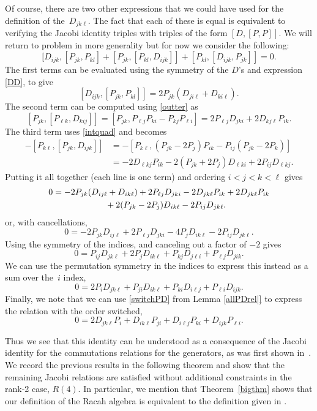 \documentclass[pdftex]{sigma}
\numberwithin{equation}{section}
\begin{document}
Of course, there are two other expressions that we could have used for the definition of the~$D_{jk\ell}$. The fact that each of these is equal is equivalent to verifying the Jacobi identity triples with triples of the form $[D, [P, P]]$. We will return to problem in more generality but for now we consider the following:
\[
[ D_{ijk}, [P_{jk}, P_{kl}]+ [ P_{jk}, [ P_{kl}, D_{ijk}]]+[P_{kl}, [ D_{ijk}, P_{jk}]]=0 .
\]
The first terms can be evaluated using the symmetry of the $D$'s and expression \eqref{DD}, to give
\[
[ D_{ijk}, [P_{jk}, P_{kl}]]= 2P_{jk}( D_{ji\ell}+D_{ki\ell}).
\]
The second term can be computed using \eqref{outter} as
\[ [ P_{jk}, [ P_{\ell k}, D_{kij}]] = [P_{jk}, P_{\ell j}P_{ki} - P_{kj}P_{\ell i}] = 2P_{\ell j} D_{jki}+2D_{kj\ell} P_{ik}.\]
The third term uses \eqref{intquad} and becomes
\begin{align*}
-[P_{k\ell}, [ P_{jk}, D_{ijk}]] &= -[P_{k\ell},( P_{jk}-2P_j)P_{ik} - P_{ij}(P_{jk}-2P_{k})]\\
&= -2D_{\ell kj}P_{ik} -2(P_{jk} +2P_j)D_{\ell k i}+2P_{ij}D_{\ell k j}.
\end{align*}
Putting it all together (each line is one term) and ordering $i< j< k <\ell$ gives
\begin{gather*}
0 =  -2P_{jk}(D_{ ij \ell} +D_{ i k\ell})+2P_{\ell j} D_{jki}-2D_{jk\ell} P_{ik}
+2D_{jk\ell}P_{ik}\\
\hphantom{0=} +2(P_{jk} -2P_j)D_{ik \ell}-2P_{ij}D_{jk\ell} .
\end{gather*}
 or, with cancellations,
\[ 0 =-2P_{jk}D_{ ij \ell}+2P_{\ell j} D_{jki}-4P_jD_{ik \ell}-2P_{ij}D_{jk\ell} .\]
Using the symmetry of the indices, and canceling out a factor of $-2$ gives
\[
 0 =P_{ij}D_{jk\ell}+2P_jD_{i k \ell} +P_{kj}D_{ j \ell i}+P_{\ell j} D_{jik}.%
\]
We can use the permutation symmetry in the indices to express this instead as a sum over the~$i$ index,
\begin{equation}
 0 =2P_{i}D_{jk\ell}+P_{ji}D_{i k \ell} +P_{ki}D_{ i \ell j}+P_{\ell i} D_{ijk}\label{PDi}.
\end{equation}
Finally, we note that we can use \eqref{switchPD} from Lemma \ref{allPDrel|} to express the relation with the order switched,
\[%
0 =2D_{jk\ell}P_{i}+D_{i k \ell}P_{ji} +D_{ i \ell j}P_{ki}+ D_{ijk}P_{\ell i}.
\]

Thus we see that this identity can be understood as a consequence of the Jacobi identity for the commutations relations for the generators, as was first shown in~\cite{CGPAV22}. We record the previous results in the following theorem and show that the remaining Jacobi relations are satisfied without additional constraints in the rank-2 case, $R(4)$. In particular, we mention that Theorem~\ref{bigthm} shows that our definition of the Racah algebra is equivalent to the definition given in \cite{CGPAV22}.
\end{document}
